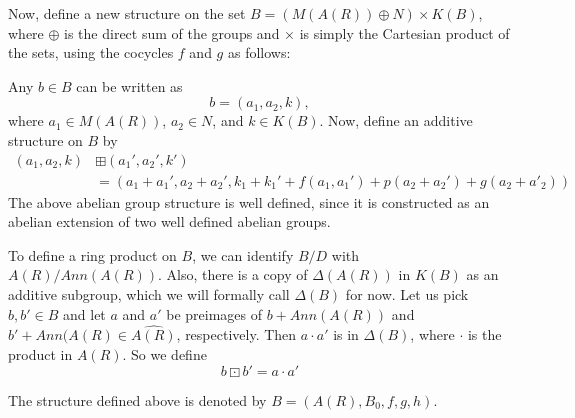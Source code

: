 \documentclass{article}
\theoremstyle{remark}
\def\Z{{\mathbb{Z}}}
\begin{document}


Now, define a new structure on the set $B=(M(A(R))\oplus N) \times K(B)$, where $\oplus$ is the direct sum of the groups and $\times$ is simply the Cartesian product of the sets, using the cocycles $f$ and $g$ as follows: 
 
Any $b\in B$ can be written as $$b=(a_1,a_2,k),$$ where $a_1\in M(A(R))$, $a_2\in N$, and $k\in K(B)$. Now, define an additive structure on $B$ by 
\begin{align*} (a_1,a_2,k) &\boxplus (a_1',a_2',k')\\
&=(a_1+a_1', a_2+a_2', k_1+k_1'+f(a_1,a_1')+p(a_2+a_2')+g(a_2+a'_2))\end{align*}
The above abelian group structure is well defined, since it is constructed as an abelian extension of two well defined abelian groups.

To define a ring product on $B$, we can identify $B/D$ with $A(R)/Ann(A(R))$. Also, there is a copy of $\Delta(A(R))$ in $K(B)$ as an additive subgroup, which we will formally call $\Delta(B)$ for now. Let us pick $b, b' \in B$ and let $a$ and $a'$ be preimages of $b+Ann(A(R))$ and $b'+Ann(A(R) \in \widehat{A(R)}$, respectively. Then $a\cdot a'$ is in $\Delta(B)$, where $\cdot$ is the product in $A(R)$. So we define
 $$b\boxdot b'=a\cdot a'$$

 The structure defined above is denoted by $B=(A(R),B_0,f,g,h)$.
\end{document}
